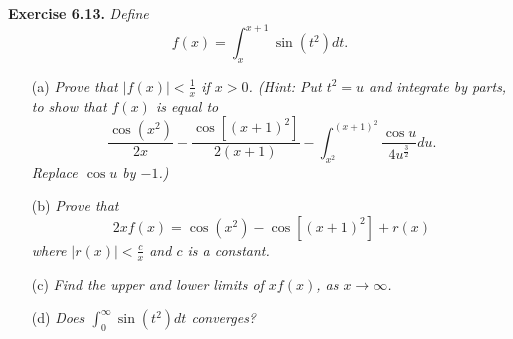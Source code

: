 \documentclass{article}
\begin{document}



\textbf{Exercise 6.13.}
\emph{Define
\[
  f(x) = \int_{x}^{x+1} \sin(t^2)dt.
\]}
\begin{enumerate}
  \item[(a)]
  \emph{Prove that $|f(x)| < \frac{1}{x}$ if $x > 0$.
  (Hint: Put $t^2 = u$ and integrate by parts, to show that $f(x)$ is equal to
  \[
    \frac{\cos(x^2)}{2x} - \frac{\cos[(x+1)^2]}{2(x+1)}
    - \int_{x^2}^{(x+1)^2} \frac{\cos u}{4u^{\frac{3}{2}}} du.
  \]
  Replace $\cos u$ by $-1$.)}

  \item[(b)]
  \emph{Prove that
  \[
    2xf(x) = \cos(x^2) - \cos[(x+1)^2] + r(x)
  \]
  where $|r(x)| < \frac{c}{x}$ and $c$ is a constant.}

  \item[(c)]
  \emph{Find the upper and lower limits of $xf(x)$, as $x \to \infty$.}

  \item[(d)]
  \emph{Does $\int_{0}^{\infty} \sin(t^2)dt$ converges?} \\
\end{enumerate}
\end{document}
